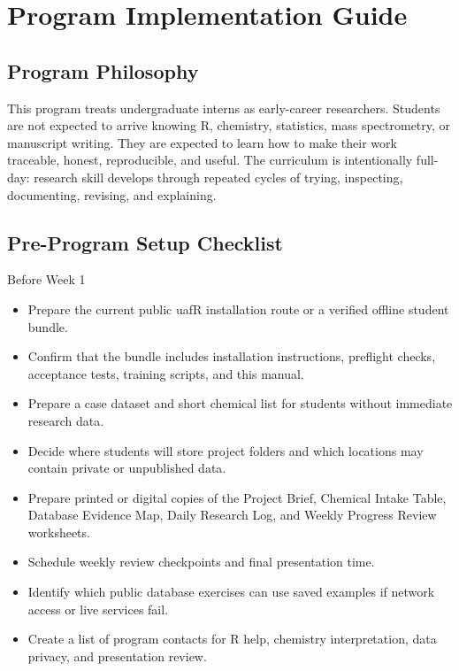 \chapter{Program Implementation Guide}

\section{Program Philosophy}
This program treats undergraduate interns as early-career researchers. Students are not expected to arrive knowing R, chemistry, statistics, mass spectrometry, or manuscript writing. They are expected to learn how to make their work traceable, honest, reproducible, and useful. The curriculum is intentionally full-day: research skill develops through repeated cycles of trying, inspecting, documenting, revising, and explaining.

\section{Pre-Program Setup Checklist}
\begin{checklistbox}{Before Week 1}
\begin{itemize}
  \item Prepare the current public uafR installation route or a verified offline student bundle.
  \item Confirm that the bundle includes installation instructions, preflight checks, acceptance tests, training scripts, and this manual.
  \item Prepare a case dataset and short chemical list for students without immediate research data.
  \item Decide where students will store project folders and which locations may contain private or unpublished data.
  \item Prepare printed or digital copies of the Project Brief, Chemical Intake Table, Database Evidence Map, Daily Research Log, and Weekly Progress Review worksheets.
  \item Schedule weekly review checkpoints and final presentation time.
  \item Identify which public database exercises can use saved examples if network access or live services fail.
  \item Create a list of program contacts for R help, chemistry interpretation, data privacy, and presentation review.
\end{itemize}
\end{checklistbox}

